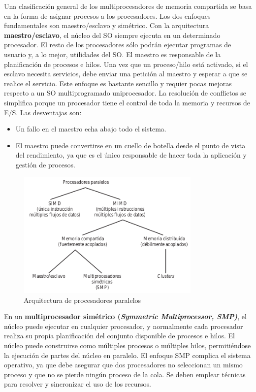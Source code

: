 \documentclass{article}
\begin{document}
				Una clasificación general de los multiprocesadores de memoria compartida se basa en la forma de asignar procesos a los procesadores. Los dos enfoques fundamentales son maestro/esclavo y simétrico. Con la arquitectura \textbf{maestro/esclavo}, el núcleo del SO siempre ejecuta en un determinado procesador. El resto de los procesadores sólo podrán ejecutar programas de usuario y, a lo mejor, utilidades del SO. El maestro es responsable de la planificación de procesos e hilos. Una vez que un proceso/hilo está activado, si el esclavo necesita servicios, debe enviar una petición al maestro y esperar a que se realice el servicio. Este enfoque es bastante sencillo y requier pocas mejoras respecto a un SO multiprogramado uniprocesador. La resolución de conflictos se simplifica porque un procesador tiene el control de toda la memoria y recursos de E/S. Las desventajas son:
				
				\begin{itemize}
				\item Un fallo en el maestro echa abajo todo el sistema.
				\item El maestro puede convertirse en un cuello de botella desde el punto de vista del rendimiento, ya que es el único responsable de hacer toda la aplicación y gestión de procesos.
				\end{itemize}
				
				\begin{figure}
				\caption{Arquitectura de procesadores paralelos}
				\label{figura28:arquitecturaprocesadoresparalelos}
				\centering
				\includegraphics[width=0.8\textwidth, scale=1]{figura28.png}
				\end{figure}
				
				En un \textbf{multiprocesador simétrico (\textit{Symmetric Multiprocessor, SMP)}}, el núcleo puede ejecutar en cualquier procesador, y normalmente cada procesador realiza su propia planificación del conjunto disponible de procesos e hilos. El núcleo puede construirse como múltiples procesos o múltiples hilos, permitiéndose la ejecución de partes del núcleo en paralelo. El enfoque SMP complica el sistema operativo, ya que debe asegurar que dos procesadores no seleccionan un mismo proceso y que no se pierde ningún proceso de la cola. Se deben emplear técnicas para resolver y sincronizar el uso de los recursos.
				
\end{document}
